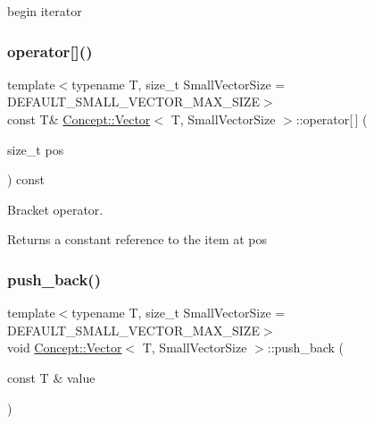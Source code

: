 begin iterator \mbox{\label{class_concept_1_1_vector_a05d5953700c6b16d416be2b5bcc5a16e}} 
\subsubsection{\texorpdfstring{operator[]()}{operator[]()}\hspace{0.1cm}{\footnotesize\ttfamily [2/2]}}
{\footnotesize\ttfamily template$<$typename T, size\+\_\+t Small\+Vector\+Size = D\+E\+F\+A\+U\+L\+T\+\_\+\+S\+M\+A\+L\+L\+\_\+\+V\+E\+C\+T\+O\+R\+\_\+\+M\+A\+X\+\_\+\+S\+I\+ZE$>$ \\
const T\& \mbox{\hyperlink{class_concept_1_1_vector}{Concept\+::\+Vector}}$<$ T, Small\+Vector\+Size $>$\+::operator\mbox{[}$\,$\mbox{]} (\begin{DoxyParamCaption}\item[{size\+\_\+t}]{pos }\end{DoxyParamCaption}) const\hspace{0.3cm}{\ttfamily [inline]}}

Bracket operator. \begin{DoxyReturn}{Returns}
a constant reference to the item at pos 
\end{DoxyReturn}
\mbox{\label{class_concept_1_1_vector_a561e80a9c94307340601b7ab2270e101}} 
\subsubsection{\texorpdfstring{push\_back()}{push\_back()}}
{\footnotesize\ttfamily template$<$typename T, size\+\_\+t Small\+Vector\+Size = D\+E\+F\+A\+U\+L\+T\+\_\+\+S\+M\+A\+L\+L\+\_\+\+V\+E\+C\+T\+O\+R\+\_\+\+M\+A\+X\+\_\+\+S\+I\+ZE$>$ \\
void \mbox{\hyperlink{class_concept_1_1_vector}{Concept\+::\+Vector}}$<$ T, Small\+Vector\+Size $>$\+::push\+\_\+back (\begin{DoxyParamCaption}\item[{const T \&}]{value }\end{DoxyParamCaption})\hspace{0.3cm}{\ttfamily [inline]}}

